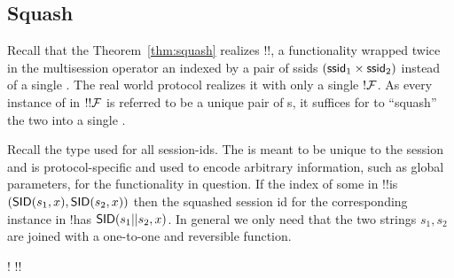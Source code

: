 \subsection{Squash} \label{sec:squash}
Recall that the Theorem~\ref{thm:squash} realizes !!\F, a functionality wrapped twice in the multisession operator an indexed by a pair of ssids $(\mathsf{ssid}_1 \times \mathsf{ssid}_2)$ instead of a single .
The real world protocol  realizes it with only a single $!\mathcal{F}$. 
As every instance of \F in $!!\mathcal{F}$ is referred to be a unique pair of s, it suffices for  to ``squash'' the two into a single .

Recall the type  used for all session-ids. The  is meant to be unique to the session and  is protocol-specific and used to encode arbitrary information, such as global parameters, for the functionality in question. 
If the index of some \F in !!\F is $({\mathsf {SID}}(s_1, x), {\mathsf {SID}}(s_2, x))$ then the squashed session id for the corresponding instance in !\F has ${\mathsf {SID}}(s_1 || s_2, x)$. 
In general we only need that the two strings $s_1, s_2$ are joined with a one-to-one and reversible function. 

\begin{theorem} \label{thm:squash}
	\begin{mathpar}
		{
			!\F {} !!\F
		}
	\end{mathpar}
\end{theorem}

